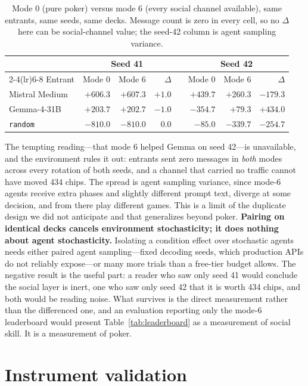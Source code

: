 \documentclass{article}
\begin{document}
\begin{table}[t]
\caption{Mode 0 (pure poker) versus mode 6 (every social channel
available), same entrants, same seeds, same decks. Message count is zero in
every cell, so no $\Delta$ here can be social-channel value; the seed-42
column is agent sampling variance.}
\label{tab:ladder}
\centering
\small
\begin{tabular}{lrrrcrrr}
\toprule
& \multicolumn{3}{c}{Seed 41} & & \multicolumn{3}{c}{Seed 42} \\
\cmidrule(lr){2-4}\cmidrule(lr){6-8}
Entrant & Mode 0 & Mode 6 & $\Delta$ & & Mode 0 & Mode 6 & $\Delta$ \\
\midrule
Mistral Medium & $+606.3$ & $+607.3$ & $+1.0$ & & $+439.7$ & $+260.3$ & $-179.3$ \\
Gemma-4-31B & $+203.7$ & $+202.7$ & $-1.0$ & & $-354.7$ & $+79.3$ & $+434.0$ \\
\texttt{random} & $-810.0$ & $-810.0$ & $0.0$ & & $-85.0$ & $-339.7$ & $-254.7$ \\
\bottomrule
\end{tabular}
\end{table}

The tempting reading---that mode 6 helped Gemma on seed 42---is unavailable,
and the environment rules it out: entrants sent zero messages in
\emph{both} modes across every rotation of both seeds, and a channel that
carried no traffic cannot have moved 434 chips. The spread is agent
sampling variance, since mode-6 agents receive extra phases and slightly
different prompt text, diverge at some decision, and from there play
different games. This is a limit of the duplicate design we did not
anticipate and that generalizes beyond poker. \textbf{Pairing on identical
decks cancels environment stochasticity; it does nothing about agent
stochasticity.} Isolating a condition effect over stochastic agents needs
either paired agent sampling---fixed decoding seeds, which production APIs
do not reliably expose---or many more trials than a free-tier budget
allows. The negative result is the useful part: a reader who saw only seed
41 would conclude the social layer is inert, one who saw only seed 42 that
it is worth 434 chips, and both would be reading noise. What survives is
the direct measurement rather than the differenced one, and an evaluation
reporting only the mode-6 leaderboard would present
Table~\ref{tab:leaderboard} as a measurement of social skill. It is a
measurement of poker.


\section{Instrument validation}
\label{app:validity}
\end{document}
